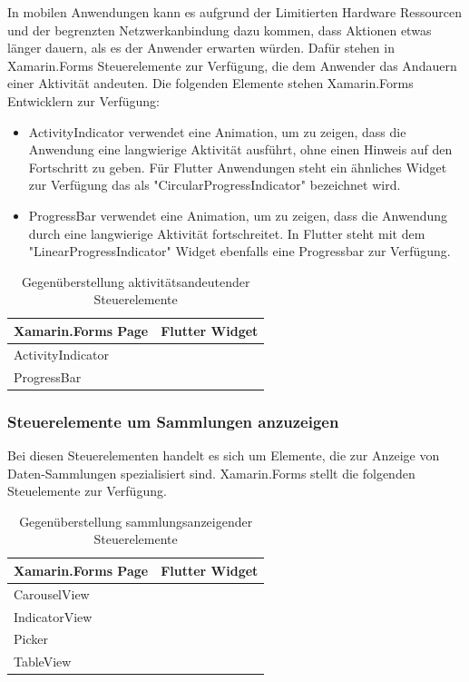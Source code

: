 In mobilen Anwendungen kann es aufgrund der Limitierten Hardware Ressourcen und der begrenzten Netzwerkanbindung dazu kommen, dass Aktionen etwas länger dauern,  als es der Anwender erwarten würden.  Dafür stehen in Xamarin.Forms Steuerelemente zur Verfügung, die dem Anwender das Andauern einer Aktivität andeuten.  Die folgenden Elemente stehen Xamarin.Forms Entwicklern zur Verfügung:

\begin{itemize}
\setlength\itemsep{-0.6em}
 \item ActivityIndicator verwendet eine Animation, um zu zeigen, dass die Anwendung eine langwierige Aktivität ausführt, ohne einen Hinweis auf den Fortschritt zu geben.  Für Flutter Anwendungen steht ein ähnliches Widget zur Verfügung das als "CircularProgressIndicator" bezeichnet wird. 
 \item ProgressBar verwendet eine Animation, um zu zeigen, dass die Anwendung durch eine langwierige Aktivität fortschreitet. In Flutter steht mit dem "LinearProgressIndicator" Widget ebenfalls eine Progressbar zur Verfügung.
\end{itemize}

\begin{table}[!ht]
\begin{tabularx}{\textwidth}{X|X}
   \textbf{Xamarin.Forms Page} & \textbf{Flutter Widget}  \\
\hline
	ActivityIndicator		       		&  	 		\\ 
	ProgressBar		       				&  	 		\\ 
\end{tabularx}
\caption{Gegenüberstellung aktivitätsandeutender Steuerelemente}
 \label{tab:eventcommands}
\end{table}


\subsubsection{Steuerelemente um Sammlungen anzuzeigen}

Bei diesen Steuerelementen handelt es sich um Elemente, die zur Anzeige von Daten-Sammlungen spezialisiert sind.  Xamarin.Forms stellt die folgenden Steuelemente zur Verfügung.


\begin{table}[!ht]
\begin{tabularx}{\textwidth}{X|X}
   \textbf{Xamarin.Forms Page} & \textbf{Flutter Widget}  \\
\hline
	CarouselView		       		&  	 		\\ 
	IndicatorView		       		&  	 		\\ 	
	Picker		       					&  	 		\\ 
	TableView		       				&  	 		\\ 
\end{tabularx}
\caption{Gegenüberstellung sammlungsanzeigender Steuerelemente}
 \label{tab:eventcommands}
\end{table}


